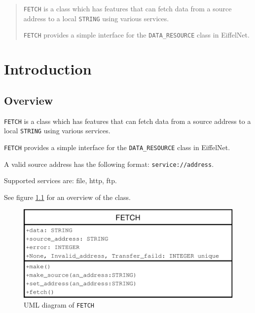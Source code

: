 \documentclass[a4paper,fleqn]{report}
\begin{document}
\begin{abstract}
  \texttt{FETCH} is a class which has features that can fetch data
  from a source address to a local \texttt{STRING} using various
  services.
  
  \texttt{FETCH} provides a simple interface for the
  \texttt{DATA\_RESOURCE} class in EiffelNet.
\end{abstract}

\clearpage
\tableofcontents

\clearpage
\listoffigures

\chapter{Introduction}
\label{cha:introduction}


\setcounter{page}{0} 



\section{Overview}
\label{sec:overview}

\texttt{FETCH} is a class which has features that can fetch data from
a source address to a local \texttt{STRING} using various services.
  
\texttt{FETCH} provides a simple interface for the
\texttt{DATA\_RESOURCE} class in EiffelNet.

A valid source address has the following format:
\texttt{service://address}.

Supported services are: file, http, ftp.

See figure \ref{fig:uml-diagram} for an overview of the class.

\begin{figure}[htbp]
  \centering
  \includegraphics[width=\textwidth]{./figures/uml}
  \caption{UML diagram of \texttt{FETCH}}
  \label{fig:uml-diagram}
\end{figure}
\end{document}
